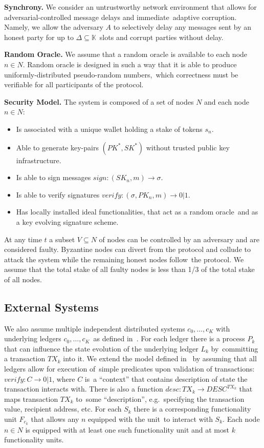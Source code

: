 \textbf{Synchrony.}
We consider an untrustworthy network environment that allows for adversarial-controlled message delays and immediate\
adaptive corruption.
Namely, we allow the adversary $A$ to selectively delay any messages sent by an honest party for up to $\Delta \subseteq \mathbb{K}$\
slots and corrupt parties without delay.

\textbf{Random Oracle.}
We assume that a random oracle is available to each node $n \in N$.
Random oracle is designed in such a way that it is able to produce uniformly-distributed pseudo-random numbers,\
which correctness must be verifiable for all participants of the protocol.

\textbf{Security Model.}\label{subsec:security-model.}
The system is composed of a set of nodes $N$ and each node $n \in N$:
\begin{itemize}
    \item Is associated with a unique wallet holding a stake of tokens $s_n$.
    \item Able to generate key-pairs ${(PK^*, SK^*)}$ without trusted public key infrastructure.
    \item Is able to sign messages ${sign: (SK_n, m) \rightarrow \sigma}$.
    \item Is able to verify signatures ${verify: (\sigma, PK_n, m) \rightarrow 0 | 1}$.
    \item Has locally installed ideal functionalities, that act as a random oracle\
    and as a key evolving signature scheme.
\end{itemize}

At any time $t$ a subset ${V \subseteq N}$ of nodes can be controlled by an adversary and are considered faulty.
Byzantine nodes can divert from the protocol and collude to attack the system while the remaining honest nodes follow\
the protocol.
We assume that the total stake of all faulty nodes is less than 1/3 of the total stake of all nodes.

\subsection{External Systems}\label{subsec:external-systems.}
We also assume multiple independent distributed systems ${c_0, \dots, c_K}$ with underlying ledgers ${c_0, \dots, c_K}$\
as defined in~\cite{cryptoeprint:2019/1128}.
For each ledger there is a process $P_k$ that can influence the state evolution of the underlying ledger $L_k$ by\
committing a transaction $TX_k$ into it.
We extend the model defined in~\cite{cryptoeprint:2019/1128} by assuming that all ledgers allow for execution of\
simple predicates upon validation of transactions: ${verify: C \rightarrow 0 | 1}$, where $C$ is\
a \enquote{context} that contains description of state the transaction interacts with.
There is also a function ${desc: TX_k \rightarrow DESC^{TX_k}}$ that maps transaction $TX_k$ to\
some \enquote{description}, e.g.\ specifying the transaction value, recipient address, etc.
For each  $S_k$ there is a corresponding functionality unit $F_{c_k}$ that allows any $n$ equipped with the unit\
to interact with $S_k$.
Each node $n \in N$ is equipped with at least one such functionality unit and at most $k$ functionality units.
